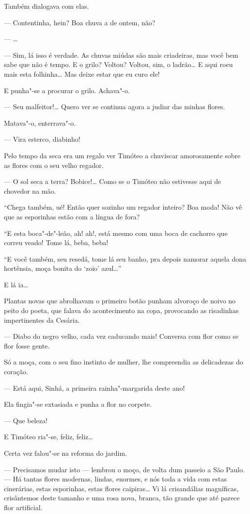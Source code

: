 Também dialogava com elas.

--- Contentinha, hein? Boa chuva a de ontem, não?

--- \ldots{}

--- Sim, lá isso é verdade. As chuvas miúdas são mais criadeiras, mas
você bem sabe que não é tempo. E o grilo? Voltou? Voltou, sim, o
ladrão\ldots{} E aqui roeu mais esta folhinha\ldots{} Mas deixe estar que eu curo
ele!

E punha"-se a procurar o grilo. Achava"-o.

--- Seu malfeitor!\ldots{} Quero ver se continua agora a judiar das minhas
flores.

Matava"-o, enterrava"-o.

--- Vira esterco, diabinho!

Pelo tempo da seca era um regalo ver Timóteo a chuviscar amorosamente
sobre as flores com o seu velho regador.

--- O sol seca a terra? Bobice!\ldots{} Como se o Timóteo não estivesse aqui
de chovedor na mão.

``Chega também, ué! Então quer sozinho um regador inteiro? Boa moda! Não
vê que as esporinhas estão com a língua de fora?

``E esta boca"-de"-leão, ah! ah!, está mesmo com uma boca de cachorro que
correu veado! Tome lá, beba, beba!

``E você também, seu resedá, tome lá seu banho, pra depois namorar
aquela dona hortênsia, moça bonita do `zoio' azul\ldots{}''

E lá ia\ldots{}

Plantas novas que abrolhavam o primeiro botão punham alvoroço de noivo
no peito do poeta, que falava do acontecimento na copa, provocando as
risadinhas impertinentes da Cesária.

--- Diabo do negro velho, cada vez caducando mais! Conversa com flor
como se flor fosse gente.

Só a moça, com o seu fino instinto de mulher, lhe compreendia as
delicadezas do coração.

--- Está aqui, Sinhá, a primeira rainha"-margarida deste ano!

Ela fingia"-se extasiada e punha a flor no corpete.

--- Que beleza!

E Timóteo ria"-se, feliz, feliz\ldots{}

Certa vez falou"-se na reforma do jardim.

--- Precisamos mudar isto --- lembrou o moço, de volta dum passeio a São
Paulo. --- Há tantas flores modernas, lindas, enormes, e nós toda a vida
com estas cinerárias, estas esporinhas, estas flores caipiras\ldots{} Vi lá
crisandálias magníficas, crisântemos deste tamanho e uma rosa nova,
branca, tão grande que até parece flor artificial.

